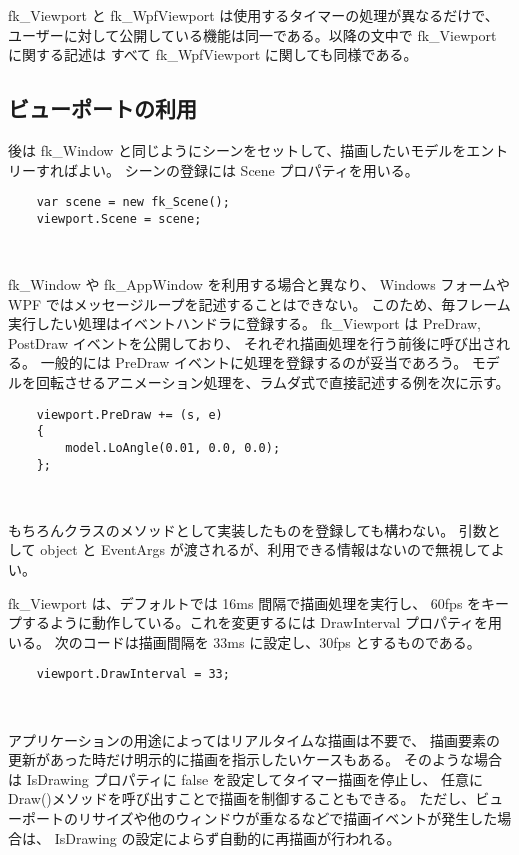 fk\_Viewport と fk\_WpfViewport は使用するタイマーの処理が異なるだけで、
ユーザーに対して公開している機能は同一である。以降の文中で fk\_Viewport に関する記述は
すべて fk\_WpfViewport に関しても同様である。

\subsection{ビューポートの利用}

後は fk\_Window と同じようにシーンをセットして、描画したいモデルをエントリーすればよい。
シーンの登録には Scene プロパティを用いる。
\\
\begin{screen}
\begin{verbatim}
    var scene = new fk_Scene();
    viewport.Scene = scene;
\end{verbatim}
\end{screen}
~

fk\_Window や fk\_AppWindow を利用する場合と異なり、
Windows フォームや WPF ではメッセージループを記述することはできない。
このため、毎フレーム実行したい処理はイベントハンドラに登録する。
fk\_Viewport は PreDraw, PostDraw イベントを公開しており、
それぞれ描画処理を行う前後に呼び出される。
一般的には PreDraw イベントに処理を登録するのが妥当であろう。
モデルを回転させるアニメーション処理を、ラムダ式で直接記述する例を次に示す。
\\
\begin{screen}
\begin{verbatim}
    viewport.PreDraw += (s, e)
    {
        model.LoAngle(0.01, 0.0, 0.0);
    };
\end{verbatim}
\end{screen}
~

もちろんクラスのメソッドとして実装したものを登録しても構わない。
引数として object と EventArgs が渡されるが、利用できる情報はないので無視してよい。

fk\_Viewport は、デフォルトでは 16ms 間隔で描画処理を実行し、
60fps をキープするように動作している。これを変更するには DrawInterval プロパティを用いる。
次のコードは描画間隔を 33ms に設定し、30fps とするものである。
\\
\begin{screen}
\begin{verbatim}
    viewport.DrawInterval = 33;
\end{verbatim}
\end{screen}
~

アプリケーションの用途によってはリアルタイムな描画は不要で、
描画要素の更新があった時だけ明示的に描画を指示したいケースもある。
そのような場合は IsDrawing プロパティに false を設定してタイマー描画を停止し、
任意に Draw()メソッドを呼び出すことで描画を制御することもできる。
ただし、ビューポートのリサイズや他のウィンドウが重なるなどで描画イベントが発生した場合は、
IsDrawing の設定によらず自動的に再描画が行われる。

